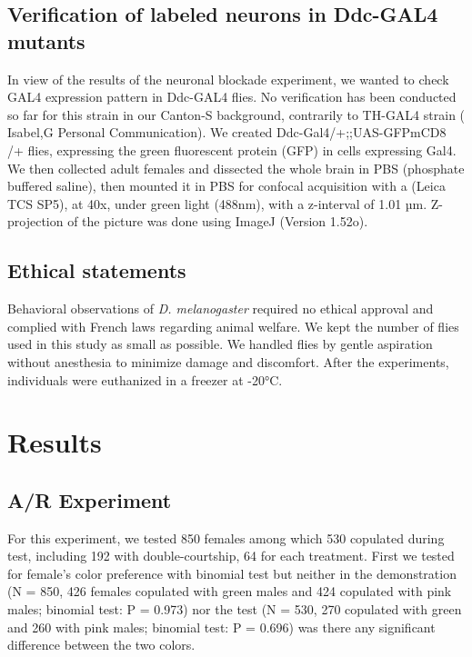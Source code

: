 \documentclass[a4paper, 12pt]{article}
\begin{document}
	\subsection{Verification of labeled neurons in Ddc-GAL4 mutants}
	
	In view of the results of the neuronal blockade experiment, we wanted to check GAL4 expression pattern in Ddc-GAL4 flies. No verification has been conducted so far for this strain in our Canton-S background, contrarily to TH-GAL4 strain ( Isabel,G Personal Communication). We created Ddc-Gal4/+;;UAS-GFPmCD8 /+ flies, expressing the green fluorescent protein (GFP) in cells expressing Gal4. We then collected adult females and dissected the whole brain in PBS (phosphate buffered saline), then mounted it in PBS for confocal acquisition with a (Leica TCS SP5), at 40x, under green light (488nm), with a z-interval of 1.01 µm. Z-projection of the picture was done using ImageJ (Version 1.52o).
	
	
	\subsection{Ethical statements}

	Behavioral observations of \textit{D. melanogaster} required no ethical approval and complied with French laws regarding animal welfare. We kept the number of flies used in this study as small as possible. We handled flies by gentle aspiration without anesthesia to minimize damage and discomfort. After the experiments, individuals were euthanized in a freezer at -20°C.

	\section{Results}

	\subsection{A/R Experiment}
	\label{subsec:AR-experiment}

	For this experiment, we tested 850 females among which 530 copulated during test, including 192 with double-courtship, 64 for each treatment. First we tested for female's color preference with binomial test but neither in the demonstration (N = 850, 426 females copulated with green males and 424 copulated with pink males; binomial test: P = 0.973) nor the test (N = 530, 270 copulated with green and 260 with pink males; binomial test: P = 0.696) was there any significant difference between the two colors.
\end{document}
